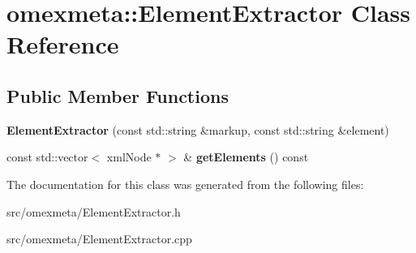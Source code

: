 \hypertarget{classomexmeta_1_1ElementExtractor}{}\section{omexmeta\+:\+:Element\+Extractor Class Reference}
\label{classomexmeta_1_1ElementExtractor}
\subsection*{Public Member Functions}
\begin{DoxyCompactItemize}
\item 
\mbox{\label{classomexmeta_1_1ElementExtractor_a9de35d2d6cf78dad4fa9fb2f46fa8e37}} 
{\bfseries Element\+Extractor} (const std\+::string \&markup, const std\+::string \&element)
\item 
\mbox{\label{classomexmeta_1_1ElementExtractor_aedddcdb8149ac96e76f20ffd56980b0c}} 
const std\+::vector$<$ xml\+Node $\ast$ $>$ \& {\bfseries get\+Elements} () const
\end{DoxyCompactItemize}


The documentation for this class was generated from the following files\+:\begin{DoxyCompactItemize}
\item 
src/omexmeta/Element\+Extractor.\+h\item 
src/omexmeta/Element\+Extractor.\+cpp\end{DoxyCompactItemize}
